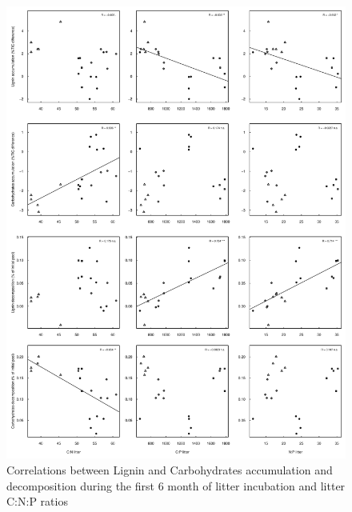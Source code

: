 \documentclass[10pt]{article}
\begin{document}
\newpage
\begin{figure}[h!]
\vspace*{2mm}
\begin{center}
\includegraphics{plosone-graphcorr2}
\end{center}
\caption{Correlations between Lignin and Carbohydrates accumulation and decomposition during the first 6 month of litter incubation and litter C:N:P ratios}
\label{fig:cor2}
\end{figure}
\end{document}
